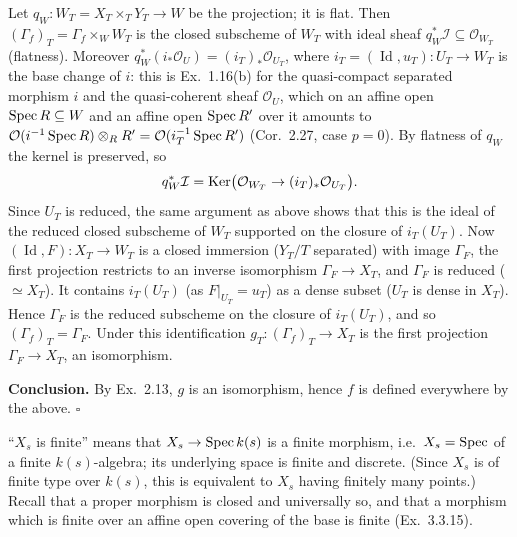 \documentclass[11pt]{article}
\begin{document}
Let $q_W:W_T=X_T\times_TY_T\to W$ be the projection; it is flat. Then $(\Gamma_f)_T=\Gamma_f\times_WW_T$ is the closed subscheme of $W_T$ with ideal sheaf $q_W^*\mathcal I\subseteq\mathcal O_{W_T}$ (flatness). Moreover $q_W^*(i_*\mathcal O_U)=(i_T)_*\mathcal O_{U_T}$, where $i_T=(\operatorname{Id},u_T):U_T\to W_T$ is the base change of $i$: this is Ex.~1.16(b) for the quasi-compact separated morphism $i$ and the quasi-coherent sheaf $\mathcal O_U$, which on an affine open $\operatorname{Spec} R\subseteq W$ and an affine open $\operatorname{Spec} R'$ over it amounts to $\mathcal O(i^{-1}\operatorname{Spec} R)\otimes_RR'=\mathcal O(i_T^{-1}\operatorname{Spec} R')$ (Cor.~2.27, case $p=0$). By flatness of $q_W$ the kernel is preserved, so
\[ q_W^*\mathcal I=\operatorname{Ker}\bigl(\mathcal O_{W_T}\to(i_T)_*\mathcal O_{U_T}\bigr). \]
Since $U_T$ is reduced, the same argument as above shows that this is the ideal of the reduced closed subscheme of $W_T$ supported on the closure of $i_T(U_T)$. Now $(\operatorname{Id},F):X_T\to W_T$ is a closed immersion ($Y_T/T$ separated) with image $\Gamma_F$, the first projection restricts to an inverse isomorphism $\Gamma_F\to X_T$, and $\Gamma_F$ is reduced ($\simeq X_T$). It contains $i_T(U_T)$ (as $F|_{U_T}=u_T$) as a dense subset ($U_T$ is dense in $X_T$). Hence $\Gamma_F$ is the reduced subscheme on the closure of $i_T(U_T)$, and so $(\Gamma_f)_T=\Gamma_F$. Under this identification $g_T:(\Gamma_f)_T\to X_T$ is the first projection $\Gamma_F\to X_T$, an isomorphism.

\textbf{Conclusion.} By Ex.~2.13, $g$ is an isomorphism, hence $f$ is defined everywhere by the above. \hfill$\square$

\pf
``$X_s$ is finite'' means that $X_s\to\operatorname{Spec} k(s)$ is a finite morphism, i.e.\ $X_s=\operatorname{Spec}$ of a finite $k(s)$-algebra; its underlying space is finite and discrete. (Since $X_s$ is of finite type over $k(s)$, this is equivalent to $X_s$ having finitely many points.) Recall that a proper morphism is closed and universally so, and that a morphism which is finite over an affine open covering of the base is finite (Ex.~3.3.15).
\end{document}
